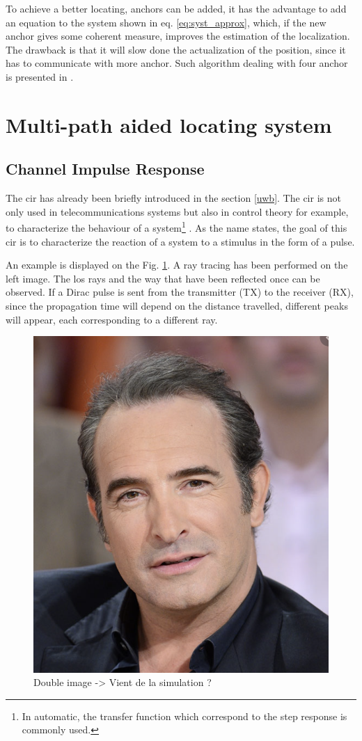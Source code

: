To achieve a better locating, anchors can be added, it has the advantage to add an equation to the system shown in eq. \ref{eq:syst_approx}, which, if the new anchor gives some coherent measure, improves the estimation of the localization. The drawback is that it will slow done the actualization of the position, since it has to communicate with more anchor. Such algorithm dealing with four anchor is presented in \cite{guyard2019navigation}.

\section{Multi-path aided locating system}

\subsection{Channel Impulse Response}

The \gls{cir} has already been briefly introduced in the section \ref{uwb}. The \gls{cir} is not only used in telecommunications systems but also in control theory for example, to characterize the behaviour of a system\footnote{In automatic, the transfer function which correspond to the step response is commonly used.} \cite{garonne2019course}. As the name states, the goal of this \gls{cir} is to characterize the reaction of a system to a stimulus in the form of a pulse.
\vspace{2mm}

An example is displayed on the Fig. \ref{fig:cir_ex1}. A ray tracing has been performed on the left image. The \gls{los} rays and the way that have been reflected once can be observed. If a Dirac pulse is sent from the transmitter (TX) to the receiver (RX), since the propagation time will depend on the distance travelled, different peaks will appear, each corresponding to a different ray.

\begin{figure}[H]
	\centering
	\includegraphics[width=.2\linewidth]{Images/Temporary_pic.png}
	\caption{Double image -> Vient de la simulation ?}
	\label{fig:cir_ex1}
\end{figure}


